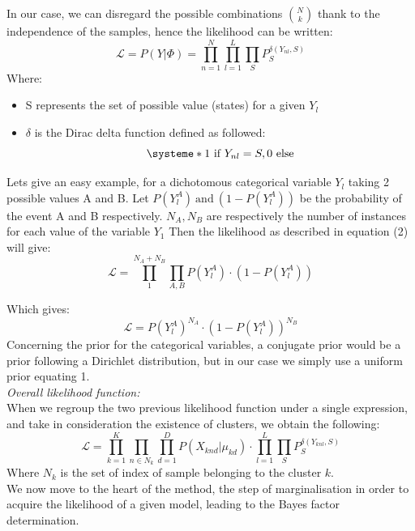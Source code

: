 \documentclass[twocolumn]{article}
\begin{document}
In our case, we can disregard the possible combinations ${N\choose k}$ thank to the independence of the samples, hence the likelihood can be written:
\begin{equation}
    \mathcal{L}=P(Y|\Phi)=\prod_{n=1}^{N}\prod_{l=1}^{L}\prod_SP_{S}^{\delta(Y_{nl},S)}
\end{equation}
Where:
\begin{itemize}
    \item S represents the set of possible value (states) for a given $Y_l$
    \item $\delta$ is the Dirac delta function defined as followed:\\
    \[ \systeme*{1\ \text{if}\ Y_{nl} = S,0\ \text{else}} \]
\end{itemize}
Lets give an easy example, for a dichotomous categorical variable $Y_l$ taking 2 possible values A and B.
Let $P(Y_{l}^A)\ \text{and}\ (1-P(Y_{l}^A))$ be the probability of the event A and B respectively.
$N_A, N_B$ are respectively the number of instances for each value of the variable $Y_1$ Then the likelihood as described in equation (2) will give:\\

$$\mathcal{L}  =  \prod_{1}^{N_A+N_B}\prod_{A,B}P(Y_{l}^A)\cdotp (1-P(Y_{l}^A))$$


Which gives:
\begin{equation}
    \mathcal{L}  =  P(Y_{l}^A)^{N_A}\cdotp (1-P(Y_{l}^A))^{N_B}
    \label{equ:exCat}
\end{equation}
Concerning the prior for the categorical variables, a conjugate prior would be a prior following a Dirichlet distribution, but in our case we simply use a uniform prior equating 1.\\

\emph{Overall likelihood function:}\\
When we regroup the two previous likelihood function under a single expression, and take in consideration the existence of clusters, we obtain the following:
\begin{equation}
    \mathcal{L} = \prod_{k=1}^K\prod_{n\in N_k}\prod_{d=1}^{D}P(X_{knd}|\mu_{kd})\cdotp \prod_{l=1}^{L}\prod_SP_{S}^{\delta(Y_{knl},S)}
    \label{equ:LwithClus}
\end{equation}
Where $N_k$ is the set of index of sample belonging to the cluster $k$.\\
We now move to the heart of the method, the step of marginalisation in order to acquire the likelihood of a given model, leading to the Bayes factor determination.
\end{document}
